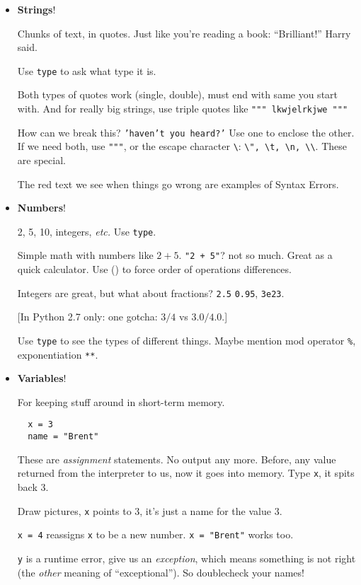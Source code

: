 \documentclass{article}
\newcommand{\etc}{\emph{etc.}\xspace}
\begin{document}
\begin{itemize}
\item \textbf{Strings}!

  Chunks of text, in quotes. Just like you're reading a book:
  ``Brilliant!'' Harry said.

  Use \texttt{type} to ask what type it is.

  Both types of quotes work (single, double), must end with same you
  start with. And for really big strings, use triple quotes like
  \texttt{""" lkwjelrkjwe """}

  How can we break this? \texttt{'haven't you heard?'}  Use one to
  enclose the other.  If we need both, use \texttt{"""}, or the escape
  character \texttt{\textbackslash}: \texttt{\textbackslash ", \textbackslash t,
    \textbackslash n, \textbackslash\textbackslash}. These are special.

  The red text we see when things go wrong are examples of Syntax
  Errors.

\item \textbf{Numbers}!

  2, 5, 10, integers, \etc  Use \texttt{type}.

  Simple math with numbers like $2+5$. \texttt{"2 + 5"}? not so much.
  Great as a quick calculator. Use () to force order of operations
  differences.

  Integers are great, but what about fractions? \texttt{2.5}
  \texttt{0.95}, \texttt{3e23}.

  [In Python 2.7 only: one gotcha: $3 / 4$ vs $3.0 / 4.0$.]

  Use \verb|type| to see the types of different things.  Maybe mention
  mod operator \verb|%|, exponentiation \verb|**|.

\item \textbf{Variables}!

  For keeping stuff around in short-term memory.
  \begin{verbatim}
  x = 3
  name = "Brent"
  \end{verbatim}
  These are \emph{assignment} statements.  No output any more. Before,
  any value returned from the interpreter to us, now it goes into
  memory.  Type \texttt{x}, it spits back 3.

  Draw pictures, \texttt{x} points to $3$, it's just a name for the
  value $3$.

  \texttt{x = 4} reassigns \texttt{x} to be a new number.  \texttt{x =
    "Brent"} works too.

  \texttt{y} is a runtime error, give us an \emph{exception}, which
  means something is not right (the \emph{other} meaning of
  ``exceptional''). So doublecheck your names!


\end{itemize}
\end{document}
